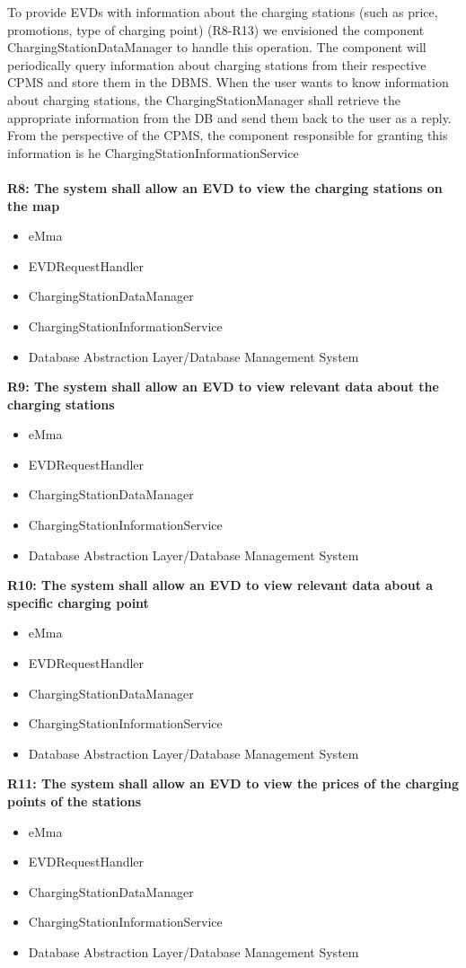 To provide EVDs with information about the charging stations (such as price, promotions, type of charging point) (R8-R13) we envisioned the component ChargingStationDataManager to handle this operation. The component will periodically query information about charging stations from their respective CPMS and store them in the DBMS. When the user wants to know information about charging stations, the ChargingStationManager shall retrieve the appropriate information from the DB and send them back to the user as a reply. From the perspective of the CPMS, the component responsible for granting this information is he ChargingStationInformationService\\
\\
\textbf{R8: The system shall allow an EVD to view the charging stations on the map}
\begin{itemize}
	\item eMma
	\item EVDRequestHandler
	\item ChargingStationDataManager
    \item ChargingStationInformationService
	\item Database Abstraction Layer/Database Management System
\end{itemize}

\textbf{R9: The system shall allow an EVD to view relevant data about the charging stations}
\begin{itemize}
	\item eMma
	\item EVDRequestHandler
	\item ChargingStationDataManager
    \item ChargingStationInformationService
	\item Database Abstraction Layer/Database Management System
\end{itemize}

\textbf{R10: The system shall allow an EVD to view relevant data about a specific charging point}
\begin{itemize}
	\item eMma
	\item EVDRequestHandler
	\item ChargingStationDataManager
    \item ChargingStationInformationService
	\item Database Abstraction Layer/Database Management System
\end{itemize}

\textbf{R11: The system shall allow an EVD to view the prices of the charging points of the stations}
\begin{itemize}
	\item eMma
	\item EVDRequestHandler
	\item ChargingStationDataManager
    \item ChargingStationInformationService
	\item Database Abstraction Layer/Database Management System
\end{itemize}

